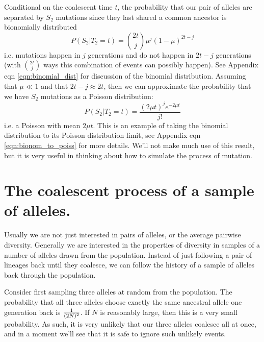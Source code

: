 Conditional on the coalescent time $t$, the probability that our pair of alleles are separated by $S_2$ mutations since they last shared a common ancestor is bionomially distributed
\begin{equation}
P(S_2 | T_2 = t ) = {2t \choose j} \mu^{j} (1-\mu)^{2t-j}
\end{equation}
i.e. mutations happen in $j$ generations and do not happen in $2t-j$
generations (with ${2t \choose j}$ ways this combination of events can possibly
happen). See Appendix eqn \eqref{eqn:binomial_dist} for discussion of the binomial distribution. Assuming that $\mu \ll 1$ and that $2t-j \approx 2t$, then we
can approximate the probability that we have $S_2$ mutations as a
Poisson distribution:
\begin{equation}
P(S_2 | T_2 = t ) = \frac{ (2 \mu t )^{j} e^{-2\mu t}}{j!}
\end{equation}
i.e. a Poisson with mean $2\mu t $. This is an example of taking the binomial distribution to its Poisson distribution limit, see Appendix eqn \eqref{eqn:bionom_to_poiss} for more details. We'll not make much use of this result, but it is very useful in thinking about how to simulate the process of mutation.\\

\section{The coalescent process of a sample of alleles.}

Usually we are not just interested in pairs of alleles, or the
average pairwise diversity. Generally we are interested in the properties of
diversity in samples of a number of alleles drawn from the population.
Instead of just following a pair of lineages back until they
coalesce, we can follow the history of a sample of alleles back
through the population.

Consider first sampling three alleles at random from the population. The
probability that all three alleles choose exactly the same ancestral allele one
generation back is $\nicefrac{1}{(2N)^2}$. If $N$ is reasonably large, then this
is a very small probability. As such, it is very unlikely that our three alleles
coalesce all at once, and in a moment we'll see that it is safe to ignore such
unlikely events. \\

